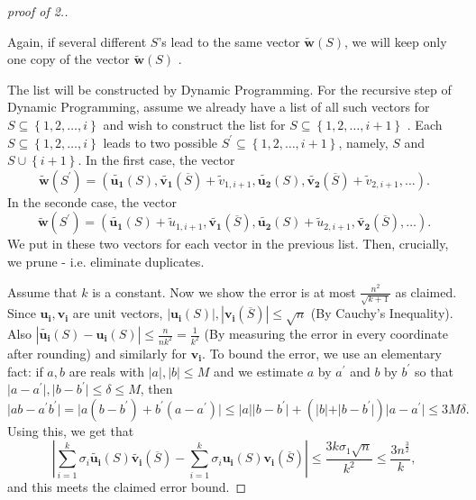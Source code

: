 \begin{proof}[proof of 2.]
  \begin{note}
    Again, if several different \(S\)'s lead to the same vector \(\widetilde{\mathbf{w} }(S) \), we will keep only one copy of the vector \(\widetilde{\mathbf{w} } (S)\) .  
  \end{note}

  The list will be constructed by Dynamic Programming. For the recursive step of Dynamic Programming, assume we already have a list of all such vectors for \(S \subseteq \left\{ 1,2,\dots ,i \right\} \) and wish to construct the list for \(S \subseteq \left\{ 1,2,\dots , i+1 \right\} \)  . Each \(S \subseteq \left\{ 1,2,\dots ,i \right\} \) leads to two possible \(S^{\prime}  \subseteq \left\{ 1,2,\dots ,i+1 \right\} \), namely, \(S\) and \(S \cup \left\{ i+1 \right\} \). In the first case, the vector 
  \[
    \widetilde{\mathbf{w} }(S^{\prime} ) = \left( \widetilde{\mathbf{u_1} }(S), \widetilde{\mathbf{v_1} }(\overline{S} ) + \widetilde{v}_{1,i+1}, \widetilde{\mathbf{u_2} }(S), \widetilde{\mathbf{v_2} }(\overline{S} ) + \widetilde{v}_{2,i+1}, \dots         \right) . 
  \]    In the seconde case, the vector
  \[
       \widetilde{\mathbf{w} }(S^{\prime} ) = \left( \widetilde{\mathbf{u_1} }(S) + \widetilde{u}_{1,i+1}, \widetilde{\mathbf{v_1} }(\overline{S} ) , \widetilde{\mathbf{u_2} }(S)  + \widetilde{u}_{2,i+1}, \widetilde{\mathbf{v_2} }(\overline{S} ), \dots         \right) .  
  \]
  We put in these two vectors for each vector in the previous list. Then, crucially, we prune - i.e. eliminate duplicates. 

  Assume that \(k\) is a constant. Now we show the error is at most \(\frac{n^2}{\sqrt{k+1} }\) as claimed. Since \(\mathbf{u_i}, \mathbf{v_i}  \) are unit vectors, \(\left\vert \mathbf{u_i}(S)  \right\vert, \left\vert \mathbf{v_i}(\overline{S} )  \right\vert \le \sqrt{n} \) (By Cauchy's Inequality). Also \(\left\vert  \widetilde{\mathbf{u_i} }(S) - \mathbf{u_i}(S)  \right\vert \le \frac{n}{nk^2}=\frac{1}{k^2} \) (By measuring the error in every coordinate after rounding) and similarly for \(\mathbf{v_i} \). To bound the error, we use an elementary fact: if \(a,b\) are reals with \(\vert a \vert, \vert b \vert   \le M\)        and we estimate \(a\) by \(a^{\prime} \) and \(b\) by \(b^{\prime} \) so that \(\vert a - a^{\prime}  \vert, \vert b - b^{\prime}  \vert \le \delta \le M  \), then 
  \[
    \vert ab - a^{\prime} b^{\prime}  \vert = \vert a(b-b^{\prime} ) + b^{\prime} (a - a^{\prime} ) \vert \le \vert a \vert \vert b - b^{\prime}  \vert + (\vert b \vert + \vert b - b^{\prime}  \vert  )\vert a - a^{\prime}  \vert \le 3M \delta .     
  \]
  Using this, we get that 
  \[
    \left\vert \sum_{i=1}^{k} \sigma _i \widetilde{\mathbf{u_i} }(S) \widetilde{\mathbf{v_i} }  (\overline{S} ) - \sum_{i=1}^k \sigma _i \mathbf{u_i}(S) \mathbf{v_i}(\overline{S} ) \right\vert  \le \frac{3k \sigma _1 \sqrt{n} }{k^2} \le \frac{3n^{\frac{3}{2}}}{k},
  \]    and this meets the claimed error bound.
  

\end{proof}
